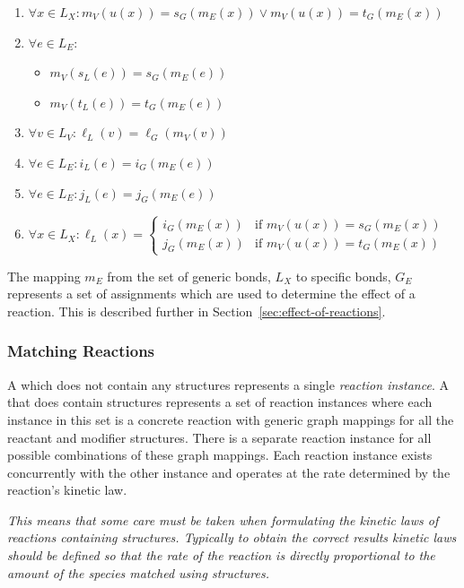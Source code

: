 \documentclass{cekarticle}
\begin{document}
\begin{enumerate}
\item $\forall x \in L_{X} : m_{V}(u(x)) = s_{G}(m_{E}(x)) \vee m_{V}(u(x)) = t_{G}(m_{E}(x))$
\item $\forall e \in L_{E} : $
    \begin{itemize}
    \item $m_{V}(s_{L}(e))= s_{G}(m_{E}(e))$
    \item $m_{V}(t_{L}(e))= t_{G}(m_{E}(e))$
    \end{itemize}
\item $\forall v \in L_{V} : \ell_{L}(v) = \ell_{G}(m_{V}(v))$
\item $\forall e \in L_{E} : i_{L}(e) = i_{G}(m_{E}(e))$
\item $\forall e \in L_{E} : j_{L}(e) = j_{G}(m_{E}(e))$
\item $ \forall x \in L_{X} : \ell_{L}(x) = \left\{
\begin{array}{ll}
i_{G}(m_{E}(x)) & \mbox{if $m_{V}(u(x)) = s_{G}(m_{E}(x))$}\\
j_{G}(m_{E}(x)) & \mbox{if $m_{V}(u(x)) = t_{G}(m_{E}(x))$}
\end{array} \right. $
\end{enumerate}

The mapping $m_{E}$ from the set of generic bonds, $L_{X}$ to specific bonds, $G_{E}$ 
represents a set of assignments which are used to determine the effect of a reaction.
This is described further in Section~\ref{sec:effect-of-reactions}. 

\subsubsection{Matching Reactions}

A  which does not contain any  structures represents a single
\emph{reaction instance}.  A  that does contain  structures
represents a set of reaction instances where each instance in this set is a concrete reaction
with generic graph mappings for all the reactant and modifier  structures.
There is a separate reaction instance for all possible combinations of these graph mappings.
Each reaction instance exists concurrently with the other instance and operates at the
rate determined by the reaction's kinetic law.

\emph{This means that some care must be taken when formulating the kinetic laws of reactions containing
 structures.  Typically to obtain the correct results kinetic laws should be defined
so that the rate of the reaction is directly proportional to the amount of the species matched
using  structures.}
\end{document}
